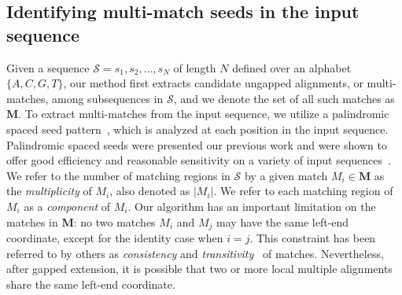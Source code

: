 \documentclass[12pt,journal,draftcls,letterpaper,onecolumn]{IEEEtran}
\begin{document}
\subsection{Identifying multi-match seeds in the input sequence}
Given a sequence $\mathcal{S}=s_1, s_2,\dots, s_N$ of length $N$
defined over an alphabet $\{A,C,G,T\}$, our method first extracts candidate ungapped
alignments, or multi-matches, among subsequences in $\mathcal{S}$,
and we denote the set of all such matches as $\mathbf{M}$. To extract multi-matches from the input
sequence, we utilize a palindromic spaced seed pattern~\cite{ref-zhang}, which is
analyzed at each position in the input sequence.
Palindromic spaced seeds were presented our previous work and were shown to offer good efficiency and
reasonable sensitivity on a variety of input
sequences~\cite{ref-procrast}.  We refer to the number of matching regions
in $\mathcal{S}$ by a given match $M_i \in \mathbf{M}$ as the
\textit{multiplicity} of $M_i$, also denoted as $|M_i|$. We refer to each
matching region of $M_i$ as a \textit{component} of $M_i$. Our
algorithm has an important limitation on the matches in $\mathbf{M}$:
no two matches $M_i$ and $M_j$ may have the same left-end coordinate,
except for the identity case when $i=j$.  This constraint has been
referred to by others as \textit{consistency} and
\textit{transitivity}~\cite{ref-transitivity} of matches. Nevertheless,
after gapped extension, it is possible that two or more
local multiple alignments share the same left-end coordinate.
\end{document}
